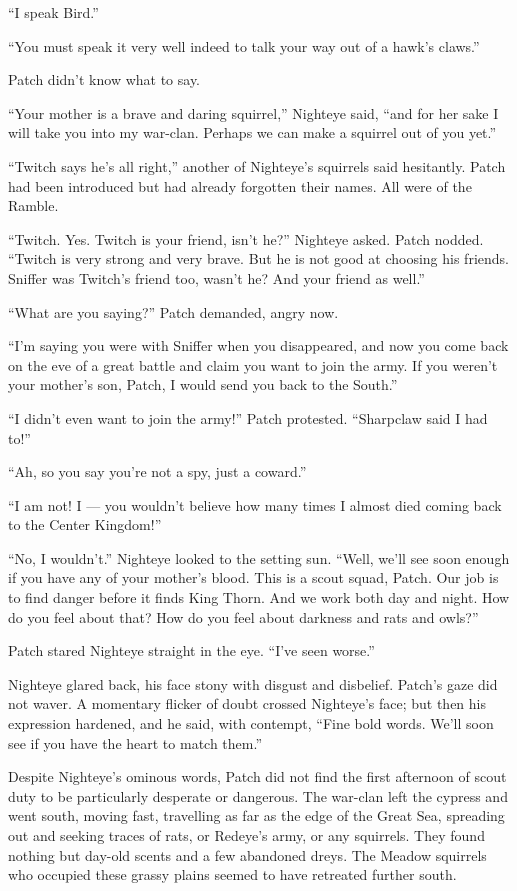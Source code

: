 \documentclass[ebook,oneside,openany,12pt]{memoir}
\begin{document}
“I speak Bird.”

“You must speak it very well indeed to talk your way out of a hawk’s
claws.”

Patch didn’t know what to say.

“Your mother is a brave and daring squirrel,” Nighteye said, “and for
her sake I will take you into my war-clan. Perhaps we can make a
squirrel out of you yet.”

“Twitch says he’s all right,” another of Nighteye’s squirrels said
hesitantly. Patch had been introduced but had already forgotten their
names. All were of the Ramble.

“Twitch. Yes. Twitch is your friend, isn’t he?” Nighteye asked. Patch
nodded. “Twitch is very strong and very brave. But he is not good at
choosing his friends. Sniffer was Twitch’s friend too, wasn’t he? And
your friend as well.”

“What are you saying?” Patch demanded, angry now.

“I’m saying you were with Sniffer when you disappeared, and now you
come back on the eve of a great battle and claim you want to join the
army. If you weren’t your mother’s son, Patch, I would send you back
to the South.”

“I didn’t even want to join the army!” Patch protested. “Sharpclaw
said I had to!”

“Ah, so you say you’re not a spy, just a coward.”

“I am not! I — you wouldn’t believe how many times I almost died
coming back to the Center Kingdom!”

“No, I wouldn’t.” Nighteye looked to the setting sun. “Well, we’ll see
soon enough if you have any of your mother’s blood. This is a scout
squad, Patch. Our job is to find danger before it finds King
Thorn. And we work both day and night. How do you feel about that? How
do you feel about darkness and rats and owls?”

Patch stared Nighteye straight in the eye. “I’ve seen worse.”

Nighteye glared back, his face stony with disgust and
disbelief. Patch’s gaze did not waver. A momentary flicker of doubt
crossed Nighteye’s face; but then his expression hardened, and he
said, with contempt, “Fine bold words. We’ll soon see if you have the
heart to match them.”

Despite Nighteye’s ominous words, Patch did not find the first
afternoon of scout duty to be particularly desperate or dangerous. The
war-clan left the cypress and went south, moving fast, travelling as
far as the edge of the Great Sea, spreading out and seeking traces of
rats, or Redeye’s army, or any squirrels. They found nothing but
day-old scents and a few abandoned dreys. The Meadow squirrels who
occupied these grassy plains seemed to have retreated further south.
\end{document}
